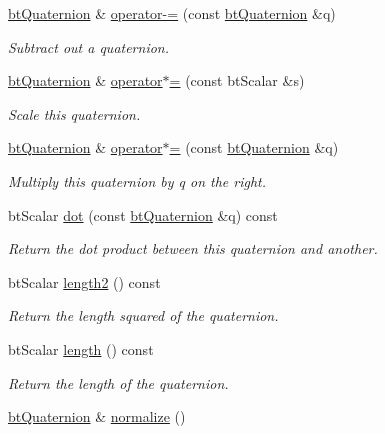 \begin{DoxyCompactItemize}
\hyperlink{classbt_quaternion}{bt\+Quaternion} \& \hyperlink{classbt_quaternion_ac942e70c62d09538e3f6d9c42bc42c5c}{operator-\/=} (const \hyperlink{classbt_quaternion}{bt\+Quaternion} \&q)
\begin{DoxyCompactList}\small\item\em Subtract out a quaternion. \end{DoxyCompactList}\item 
\hyperlink{classbt_quaternion}{bt\+Quaternion} \& \hyperlink{classbt_quaternion_abd260487e98defbd77618f04d51fcc92}{operator$\ast$=} (const bt\+Scalar \&s)
\begin{DoxyCompactList}\small\item\em Scale this quaternion. \end{DoxyCompactList}\item 
\hyperlink{classbt_quaternion}{bt\+Quaternion} \& \hyperlink{classbt_quaternion_abfc6dee30a6f56e69343a31368713f95}{operator$\ast$=} (const \hyperlink{classbt_quaternion}{bt\+Quaternion} \&q)
\begin{DoxyCompactList}\small\item\em Multiply this quaternion by q on the right. \end{DoxyCompactList}\item 
bt\+Scalar \hyperlink{classbt_quaternion_a37e450f3206a7b6f3f55049e297fb403}{dot} (const \hyperlink{classbt_quaternion}{bt\+Quaternion} \&q) const 
\begin{DoxyCompactList}\small\item\em Return the dot product between this quaternion and another. \end{DoxyCompactList}\item 
\hypertarget{classbt_quaternion_a59cc2f3a2c732aba98cd43764165b8cd}{bt\+Scalar \hyperlink{classbt_quaternion_a59cc2f3a2c732aba98cd43764165b8cd}{length2} () const }\label{classbt_quaternion_a59cc2f3a2c732aba98cd43764165b8cd}

\begin{DoxyCompactList}\small\item\em Return the length squared of the quaternion. \end{DoxyCompactList}\item 
\hypertarget{classbt_quaternion_a9041c1885648f81009f41fc2aa6c17df}{bt\+Scalar \hyperlink{classbt_quaternion_a9041c1885648f81009f41fc2aa6c17df}{length} () const }\label{classbt_quaternion_a9041c1885648f81009f41fc2aa6c17df}

\begin{DoxyCompactList}\small\item\em Return the length of the quaternion. \end{DoxyCompactList}\item 
\hypertarget{classbt_quaternion_adb5cd1eb8145a906f9f47857c498d3d6}{\hyperlink{classbt_quaternion}{bt\+Quaternion} \& \hyperlink{classbt_quaternion_adb5cd1eb8145a906f9f47857c498d3d6}{normalize} ()}\label{classbt_quaternion_adb5cd1eb8145a906f9f47857c498d3d6}


\end{DoxyCompactItemize}

